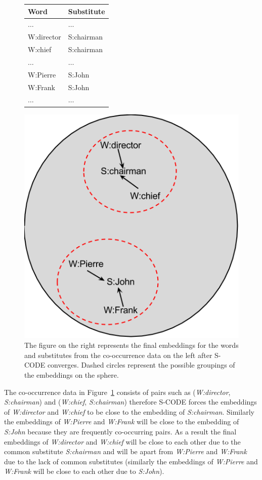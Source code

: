 \begin{figure}[ht]
\centering
  \begin{minipage}[c]{0.38\textwidth}
    \begin{tabular}{|l|l|}
    \hline
    \textbf{Word} & \textbf{Substitute} \\
    \hline
    $\hdots$&$\hdots$\\
    W:director & S:chairman \\
    W:chief & S:chairman \\
    $\hdots$&$\hdots$\\
    W:Pierre & S:John \\
    W:Frank & S:John \\
    $\hdots$&$\hdots$\\
    \hline
  \end{tabular}
  \end{minipage}
  \begin{minipage}[c]{0.48\textwidth}
    \includegraphics[height=.6\textwidth]{scode-ex.png}
  \end{minipage}
  \caption{The figure on the right represents the final embeddings for the
    words and substitutes from the co-occurrence data on the left after
    S-CODE converges.  Dashed circles represent the possible groupings
    of the embeddings on the sphere.}
  \label{fig:scodeexample}
\end{figure}

The co-occurrence data in Figure~\ref{fig:scodeexample} consists of
pairs such as (\textit{W:director}, \textit{S:chairman}) and
(\textit{W:chief}, \textit{S:chairman}) therefore S-CODE forces the
embeddings of \textit{W:director} and \textit{W:chief} to be close to
the embedding of \textit{S:chairman}.  Similarly the embeddings of
\textit{W:Pierre} and \textit{W:Frank} will be close to the embedding
of \textit{S:John} because they are frequently co-occurring pairs.  As
a result the final embeddings of \textit{W:director} and
\textit{W:chief} will be close to each other due to the common
substitute \textit{S:chairman} and will be apart from
\textit{W:Pierre} and \textit{W:Frank} due to the lack of common
substitutes (similarly the embeddings of \textit{W:Pierre} and
\textit{W:Frank} will be close to each other due to \textit{S:John}).

